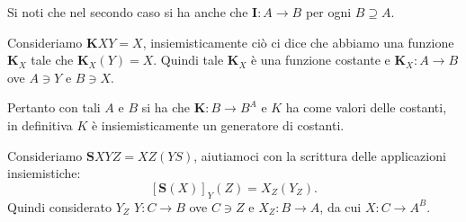 \documentclass{book}
\newcommand*{\ii}{\mathbf{I}}    %
\newcommand*{\kk}{\mathbf{K}}    %
\newcommand*{\sss}{\mathbf{S}}   %
\begin{document}
Si noti che nel secondo caso si ha anche che $\ii\colon A \to B$ per 
ogni $B \supseteq A$.

\vspace{0.5 cm}Consideriamo $\kk XY = X$, insiemisticamente ci\`o ci dice che
abbiamo una funzione $\kk_{X}$ tale che $\kk_{X}(Y) = X$. Quindi tale $\kk_{X}$
 \`e una funzione costante e $\kk_{X}: A \longrightarrow B$ ove $A \ni Y$ e 
$B \ni X$.

Pertanto con tali $A$ e $B$ si ha che $\kk\colon B \to B^A$ e $K$ ha come
valori delle costanti, in definitiva $K$ \`e insiemisticamente un generatore
di costanti.

\vspace{0.5 cm}Consideriamo $\sss XYZ = XZ(YS)$, aiutiamoci con la scrittura 
delle applicazioni insiemistiche:
\[
[\sss(X)]_{Y}(Z) = X_{Z}(Y_{Z}).
\]
Quindi considerato $Y_Z$ $Y: C \longrightarrow B$ ove $C \ni Z$ e 
$X_{Z}\colon B \to A$, da cui $X \colon C \longrightarrow A^B$.
\end{document}
